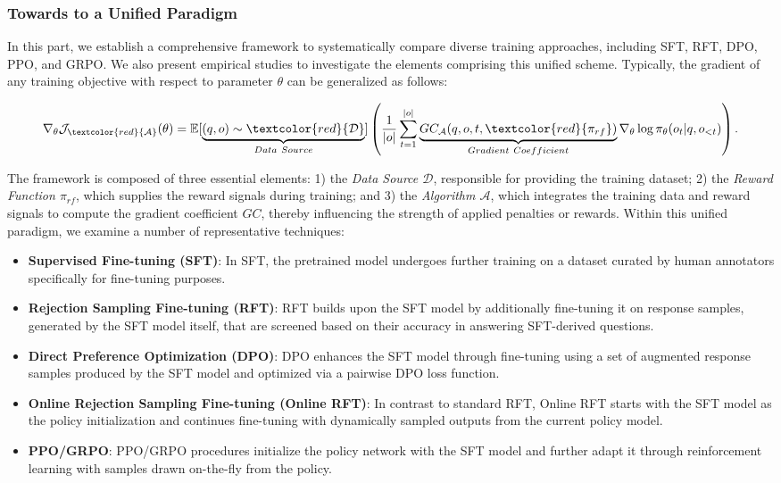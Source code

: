 \begin{itemize}[topsep=0pt]
\begin{itemize}[topsep=0pt]
\subsubsection{Towards to a Unified Paradigm} 
In this part, we establish a comprehensive framework to systematically compare diverse training approaches, including SFT, RFT, DPO, PPO, and GRPO. We also present empirical studies to investigate the elements comprising this unified scheme. Typically, the gradient of any training objective with respect to parameter $\theta$ can be generalized as follows:

\begin{equation}
    \nabla_{\theta}\mathcal{J}_{\textcolor{red}{\mathcal{A}}}(\theta) = \mathbb{E}[\underbrace{(q,o) \sim \textcolor{red}{\mathcal{D}}}_{Data \ Source}]\left( \frac{1}{|o|} \sum_{t=1}^{|o|}  \underbrace{GC_{{\mathcal{A}}}(q, o, t, \textcolor{red}{\pi_{{rf}}})}_{Gradient \ Coefficient}  \nabla_{\theta}\log \pi_{\theta}(o_t | q, o_{<t})\right).
\label{eq:objective}
\end{equation}

The framework is composed of three essential elements: 1) the \textit{Data Source $\mathcal{D}$}, responsible for providing the training dataset; 2) the \textit{Reward Function $\pi_{{rf}}$}, which supplies the reward signals during training; and 3) the \textit{Algorithm $\mathcal{A}$}, which integrates the training data and reward signals to compute the gradient coefficient $GC$, thereby influencing the strength of applied penalties or rewards. Within this unified paradigm, we examine a number of representative techniques:

\begin{itemize}
    \item  \textbf{Supervised Fine-tuning (SFT)}: In SFT, the pretrained model undergoes further training on a dataset curated by human annotators specifically for fine-tuning purposes.
    \item \textbf{Rejection Sampling Fine-tuning (RFT)}: RFT builds upon the SFT model by additionally fine-tuning it on response samples, generated by the SFT model itself, that are screened based on their accuracy in answering SFT-derived questions.
    \item \textbf{Direct Preference Optimization (DPO)}: DPO enhances the SFT model through fine-tuning using a set of augmented response samples produced by the SFT model and optimized via a pairwise DPO loss function.
    \item \textbf{Online Rejection Sampling Fine-tuning (Online RFT)}: In contrast to standard RFT, Online RFT starts with the SFT model as the policy initialization and continues fine-tuning with dynamically sampled outputs from the current policy model.
    \item \textbf{PPO/GRPO}: PPO/GRPO procedures initialize the policy network with the SFT model and further adapt it through reinforcement learning with samples drawn on-the-fly from the policy.
\end{itemize}


\end{itemize}
\end{itemize}
